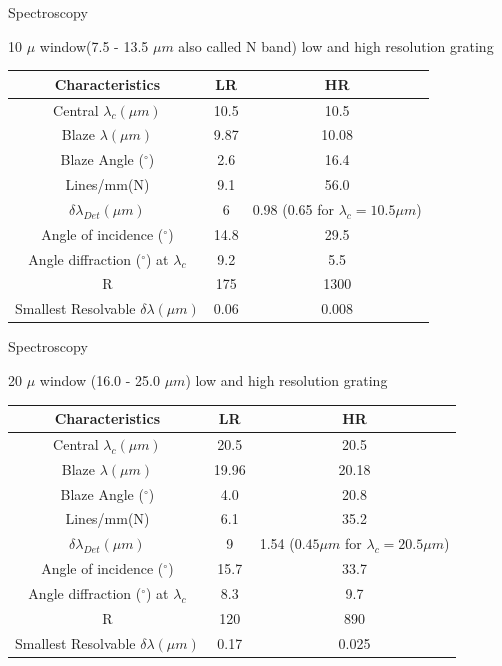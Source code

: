 \documentclass{beamer}
\begin{document}
\begin{frame}{Spectroscopy}

10 $\mu $ window(7.5 - 13.5 $\mu m$ also called N band) low and high resolution grating
\begin{tabular}{|c|c|c|}
\hline
Characteristics & 	LR	& HR \\
\hline
Central $\lambda_c(\mu m)$	& 10.5	& 10.5 \\
\hline
Blaze $\lambda (\mu m)$ &	9.87	& 10.08 \\
\hline
Blaze Angle ($^{\circ}$) & 	2.6	& 16.4 \\
\hline
Lines/mm(N)	& 9.1 &	56.0 \\
\hline
$\delta \lambda_{Det} (\mu m)$ &	6	& 0.98 (0.65 for $\lambda_c = 10.5 \mu m$)\\
\hline
Angle of incidence ($^{\circ}$)	& 14.8 &	29.5\\
\hline
Angle diffraction ($^{\circ}$) at $\lambda_c$	& 9.2	& 5.5\\
\hline
R	& 175	& 1300\\
\hline
Smallest Resolvable $ \delta \lambda (\mu m)$ &	0.06	&0.008 \\
\hline
\end{tabular}
\end{frame}
\begin{frame}{Spectroscopy}

20 $\mu $ window (16.0 - 25.0 $\mu m$)  low and high resolution grating
\begin{tabular}{|c|c|c|}
\hline
Characteristics & 	LR	& HR \\
\hline
Central $\lambda_c(\mu m)$	& 20.5	& 20.5 \\
\hline
Blaze $\lambda (\mu m)$ &	19.96	& 20.18 \\
\hline
Blaze Angle ($^{\circ}$) & 	4.0	& 20.8 \\
\hline
Lines/mm(N)	& 6.1 &	35.2 \\
\hline
$\delta \lambda_{Det} (\mu m)$ &	9	& 1.54 ($0.45 \mu m$ for $\lambda_c = 20.5 \mu m$)\\
\hline
Angle of incidence ($^{\circ}$)	& 15.7 &	33.7\\
\hline
Angle diffraction ($^{\circ}$) at $\lambda_c$	& 8.3	& 9.7\\
\hline
R	& 120	& 890\\
\hline
Smallest Resolvable $ \delta \lambda (\mu m)$ &	0.17	&0.025 \\
\hline
\end{tabular}



\end{frame}
\end{document}
